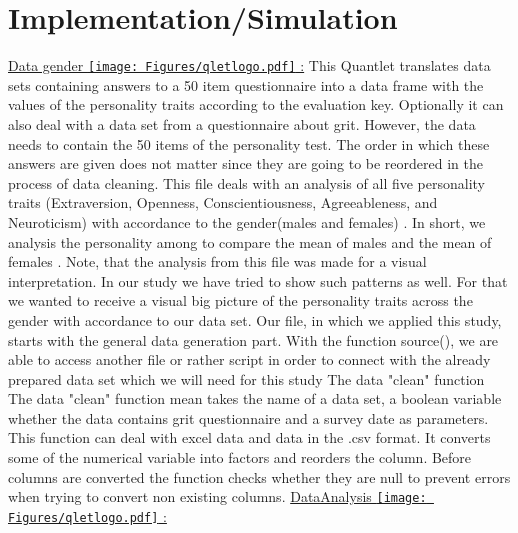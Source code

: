 \section{Implementation/Simulation}


\underline{Data gender
\href{https://github.com/sahnouna/BIG_FIVE_PERSONALITIES/blob/master/DataAnalysis.R}{\texttt{[image: Figures/qletlogo.pdf]}} :} 
\newline 
This Quantlet translates data sets containing answers to a 50 item questionnaire into a data frame with the values of the personality traits according to the evaluation key. Optionally it can also deal with a data set from a questionnaire about grit. However, the data needs to contain the 50 items of the personality test. The order in which these answers are given does not matter since they are going to be reordered in the process of data cleaning.
\newline
This file deals with an analysis of all five personality traits (Extraversion, Openness, Conscientiousness, Agreeableness, and Neuroticism) with accordance to the gender(males and females) . In short, we analysis the personality among to compare the mean of males and the mean of females . Note, that the analysis from this file was made for a visual interpretation.
 \newline \newline
 In our study we have tried to show such patterns as well. For that we wanted to receive a visual big picture of the personality traits across the gender with accordance to our data set. 
Our file, in which we applied this study, starts with the general data generation part. With the function source(), we are able to access another file or rather script in order to connect with the already prepared data set which we will need for this study
The data "clean" function 
The data "clean" function mean takes the name of a data set, a boolean variable whether the data contains grit questionnaire and a survey date as parameters. This function can deal with excel data and data in the .csv format. It converts some of the numerical variable into factors and reorders the column. Before columns are converted the function checks whether they are null to prevent errors when trying to convert non existing columns.
\newline
\underline{DataAnalysis
\href{https://github.com/sahnouna/BIG_FIVE_PERSONALITIES/blob/master/DataAnalysis.R}{\texttt{[image: Figures/qletlogo.pdf]}} :} 
\newline 

